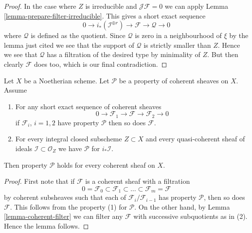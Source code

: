 \begin{proof}
\medskip\noindent
In the case where $Z$ is irreducible and $\mathcal{J}\mathcal{F} = 0$
we can apply Lemma \ref{lemma-prepare-filter-irreducible}.
This gives a short exact sequence
$$
0 \to
i_*(\mathcal{I}^{\oplus r}) \to
\mathcal{F} \to
\mathcal{Q} \to 0
$$
where $\mathcal{Q}$ is defined as the quotient.
Since $\mathcal{Q}$ is zero in a neighbourhood of $\xi$ by
the lemma just cited we see that the support of $\mathcal{Q}$
is strictly smaller than $Z$. Hence we see that $\mathcal{Q}$
has a filtration of the desired type by minimality of $Z$.
But then clearly $\mathcal{F}$ does too, which is our final contradiction.
\end{proof}

\begin{lemma}
\label{lemma-property-initial}
Let $X$ be a Noetherian scheme.
Let $\mathcal{P}$ be a property of coherent sheaves on $X$. Assume
\begin{enumerate}
\item For any short exact sequence of coherent sheaves
$$
0 \to \mathcal{F}_1 \to \mathcal{F} \to \mathcal{F}_2 \to 0
$$
if $\mathcal{F}_i$, $i = 1, 2$ have property $\mathcal{P}$
then so does $\mathcal{F}$.
\item For every integral closed subscheme $Z \subset X$
and every quasi-coherent sheaf of ideals
$\mathcal{I} \subset \mathcal{O}_Z$ we have
$\mathcal{P}$ for $i_*\mathcal{I}$.
\end{enumerate}
Then property $\mathcal{P}$ holds for every coherent sheaf
on $X$.
\end{lemma}

\begin{proof}
First note that if $\mathcal{F}$ is a coherent sheaf with a filtration
$$
0 = \mathcal{F}_0 \subset \mathcal{F}_1 \subset
\ldots \subset \mathcal{F}_m = \mathcal{F}
$$
by coherent subsheaves such that each of $\mathcal{F}_i/\mathcal{F}_{i - 1}$
has property $\mathcal{P}$, then so does $\mathcal{F}$.
This follows from the property (1) for $\mathcal{P}$.
On the other hand, by Lemma \ref{lemma-coherent-filter}
we can filter any $\mathcal{F}$
with successive subquotients as in (2).
Hence the lemma follows.
\end{proof}

